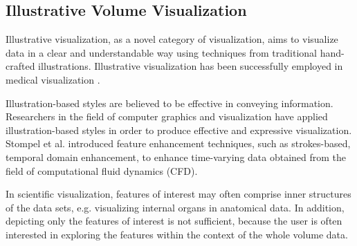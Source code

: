 \subsection{Illustrative Volume Visualization}

Illustrative visualization, as a novel category of visualization, aims to visualize data in a clear and understandable way using techniques from traditional hand-crafted illustrations.
Illustrative visualization has been successfully employed in medical visualization \cite{svakhine_illustration_2005} \cite{viola_importance-driven_2005} \cite{svakhine_illustration-inspired_2009}.

Illustration-based styles are believed to be effective in conveying information. Researchers in the field of computer graphics and visualization have applied illustration-based styles in order to produce effective and expressive visualization. Stompel et al. \cite{stompel_visualization_2002} introduced feature enhancement techniques, such as strokes-based, temporal domain enhancement, to enhance time-varying data obtained from the field of computational fluid dynamics (CFD).


In scientific visualization, features of interest may often comprise inner structures of the data sets, e.g. visualizing internal organs in anatomical data.
In addition, depicting only the features of interest is not sufficient, because the user is often interested in exploring the features within the context of the whole volume data.

